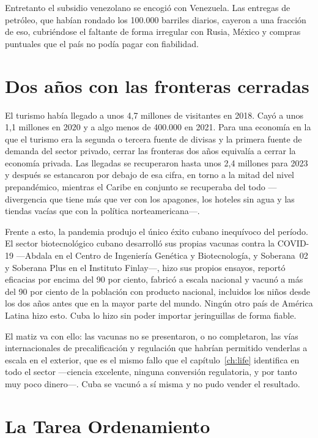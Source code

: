 Entretanto el subsidio venezolano se encogió con Venezuela. Las entregas de
petróleo, que habían rondado los 100.000 barriles diarios, cayeron a una fracción
de eso, cubriéndose el faltante de forma irregular con Rusia, México y compras
puntuales que el país no podía pagar con fiabilidad.

\section{Dos años con las fronteras cerradas}

El turismo había llegado a unos 4,7 millones de visitantes en 2018. Cayó a unos
1,1 millones en 2020 y a algo menos de 400.000 en 2021.\unv{} Para una economía en
la que el turismo era la segunda o tercera fuente de divisas y la primera fuente de
demanda del sector privado, cerrar las fronteras dos años equivalía a cerrar la
economía privada. Las llegadas se recuperaron hasta unos 2,4 millones para 2023 y
después se estancaron por debajo de esa cifra, en torno a la mitad del nivel
prepandémico, mientras el Caribe en conjunto se recuperaba del todo ---divergencia
que tiene más que ver con los apagones, los hoteles sin agua y las tiendas vacías
que con la política norteamericana---.\unv{}

Frente a esto, la pandemia produjo el único éxito cubano inequívoco del período. El
sector biotecnológico cubano desarrolló sus propias vacunas contra la COVID-19
---Abdala en el Centro de Ingeniería Genética y Biotecnología, y Soberana~02 y
Soberana Plus en el Instituto Finlay---, hizo sus propios ensayos, reportó
eficacias por encima del 90 por ciento, fabricó a escala nacional y vacunó a más
del 90 por ciento de la población con producto nacional, incluidos los niños desde
los dos años antes que en la mayor parte del mundo.\unv{} Ningún otro país de
América Latina hizo esto. Cuba lo hizo sin poder importar jeringuillas de forma
fiable.

El matiz va con ello: las vacunas no se presentaron, o no completaron, las vías
internacionales de precalificación y regulación que habrían permitido venderlas a
escala en el exterior, que es el mismo fallo que el capítulo~\ref{ch:life}
identifica en todo el sector ---ciencia excelente, ninguna conversión regulatoria,
y por tanto muy poco dinero---. Cuba se vacunó a sí misma y no pudo vender el
resultado.

\section{La Tarea Ordenamiento}

